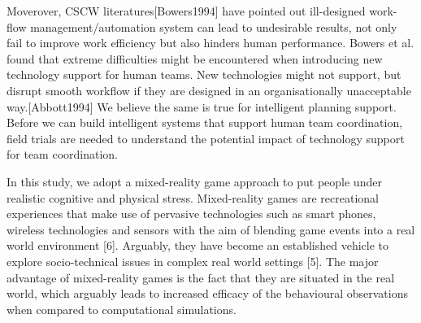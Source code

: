 Moverover, CSCW literatures[Bowers1994] have pointed out ill-designed work-flow management/automation system can lead to undesirable results, not only fail to improve work efficiency but also hinders human performance. Bowers et al. found that extreme difficulties might be encountered when introducing new technology support for human teams. New technologies might not support, but  disrupt smooth workflow if they are designed in an organisationally unacceptable way.[Abbott1994] We believe the same is true for intelligent planning support. Before we can build intelligent systems that support human team coordination, field trials are needed to understand the potential impact of technology support for team coordination. 

In this study, we adopt a mixed-reality game approach to put people under realistic cognitive and physical stress. Mixed-reality games are recreational experiences that make use of pervasive technologies such as smart phones, wireless technologies and sensors with the aim of blending game events into a real world environment [6]. Arguably, they have become an established vehicle to explore socio-technical issues in complex real world settings [5]. The major advantage of mixed-reality games is the fact that they are situated in the real world, which arguably leads to increased efficacy of the behavioural observations when compared to computational simulations.



